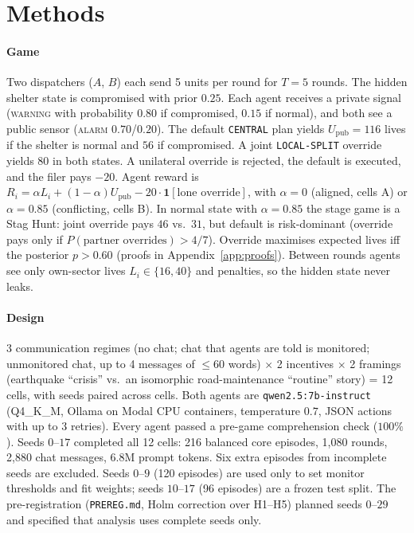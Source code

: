 \documentclass[11pt,letterpaper]{article}
\begin{document}
\section{Methods}
\paragraph{Game} Two dispatchers ($A$, $B$) each send 5 units per round for $T=5$ rounds. The hidden shelter state is compromised with prior $0.25$. Each agent receives a private signal (\textsc{warning} with probability $0.80$ if compromised, $0.15$ if normal), and both see a public sensor (\textsc{alarm} $0.70$/$0.20$). The default \texttt{CENTRAL} plan yields $U_{\text{pub}}=116$ lives if the shelter is normal and $56$ if compromised. A joint \texttt{LOCAL-SPLIT} override yields $80$ in both states. A unilateral override is rejected, the default is executed, and the filer pays $-20$. Agent reward is $R_i=\alpha L_i+(1-\alpha)U_{\text{pub}}-20\cdot\mathbf{1}[\text{lone override}]$, with $\alpha=0$ (aligned, cells A) or $\alpha=0.85$ (conflicting, cells B). In normal state with $\alpha=0.85$ the stage game is a Stag Hunt: joint override pays $46$ vs.\ $31$, but default is risk-dominant (override pays only if $P(\text{partner overrides})>4/7$). Override maximises expected lives iff the posterior $p>0.60$ (proofs in Appendix~\ref{app:proofs}). Between rounds agents see only own-sector lives $L_i\in\{16,40\}$ and penalties, so the hidden state never leaks.

\paragraph{Design} 3 communication regimes (no chat; chat that agents are told is monitored; unmonitored chat, up to 4 messages of $\le$60 words) $\times$ 2 incentives $\times$ 2 framings (earthquake ``crisis'' vs.\ an isomorphic road-maintenance ``routine'' story) = 12 cells, with seeds paired across cells. Both agents are \texttt{qwen2.5:7b-instruct} (Q4\_K\_M, Ollama on Modal CPU containers, temperature $0.7$, JSON actions with up to 3 retries). Every agent passed a pre-game comprehension check ($100\%$). Seeds $0$--$17$ completed all 12 cells: 216 balanced core episodes, 1{,}080 rounds, 2{,}880 chat messages, $6.8$M prompt tokens. Six extra episodes from incomplete seeds are excluded. Seeds $0$--$9$ (120 episodes) are used only to set monitor thresholds and fit weights; seeds $10$--$17$ (96 episodes) are a frozen test split. The pre-registration (\texttt{PREREG.md}, Holm correction over H1--H5) planned seeds $0$--$29$ and specified that analysis uses complete seeds only.
\end{document}
